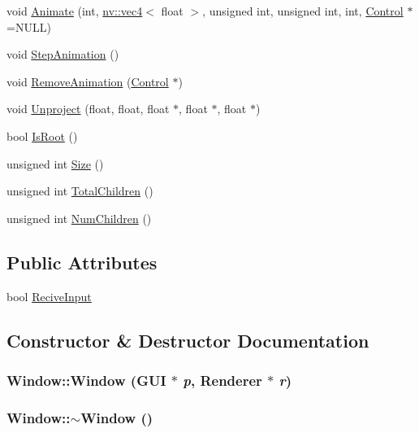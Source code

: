 \begin{CompactItemize}
\item 
void \hyperlink{class_window_cafe750f45667f2e81b8423fb496b459}{Animate} (int, \hyperlink{classnv_1_1vec4}{nv::vec4}$<$ float $>$, unsigned int, unsigned int, int, \hyperlink{class_control}{Control} $\ast$=NULL)
\item 
void \hyperlink{class_window_d5b6265475488a93e6a06c890d006367}{StepAnimation} ()
\item 
void \hyperlink{class_window_4bcf4b16db04e876b0f58c184708d280}{RemoveAnimation} (\hyperlink{class_control}{Control} $\ast$)
\item 
void \hyperlink{class_window_80173b6c9b3b856ee9f905f2ddcf51e6}{Unproject} (float, float, float $\ast$, float $\ast$, float $\ast$)
\item 
bool \hyperlink{class_window_9104959ec00d2c1dc16eb20303a6f7b7}{IsRoot} ()
\item 
unsigned int \hyperlink{class_window_7b5200a4b20ba5a0bafc43ec1207125b}{Size} ()
\item 
unsigned int \hyperlink{class_window_16719560d4f63b07aa4c554bfb1c9cdd}{TotalChildren} ()
\item 
unsigned int \hyperlink{class_window_8102d7f108485e1faf660d158d0070e8}{NumChildren} ()
\end{CompactItemize}
\subsection*{Public Attributes}
\begin{CompactItemize}
\item 
bool \hyperlink{class_window_a75fcc9f3abd4dbcfdb6fec9dc9200be}{ReciveInput}
\end{CompactItemize}


\subsection{Constructor \& Destructor Documentation}
\hypertarget{class_window_1202de5bdfb720f5d65e9faefa402da3}{
\subsubsection[{Window}]{\setlength{\rightskip}{0pt plus 5cm}Window::Window ({\bf GUI} $\ast$ {\em p}, \/  {\bf Renderer} $\ast$ {\em r})}}
\label{class_window_1202de5bdfb720f5d65e9faefa402da3}


\hypertarget{class_window_245d821e6016fa1f6970ccbbedd635f6}{
\subsubsection[{$\sim$Window}]{\setlength{\rightskip}{0pt plus 5cm}Window::$\sim$Window ()}}
\label{class_window_245d821e6016fa1f6970ccbbedd635f6}




